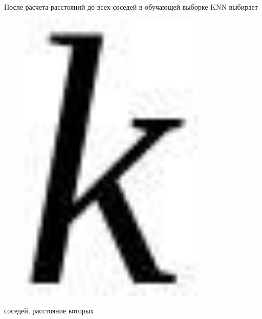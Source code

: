 После расчета расстояний до всех соседей в обучающей выборке KNN
выбирает \begin{figure}[H]
	\centering
	\includegraphics[width=0.8\textwidth]{assets/92}
	\caption*{}
\end{figure} соседей, расстояние которых
